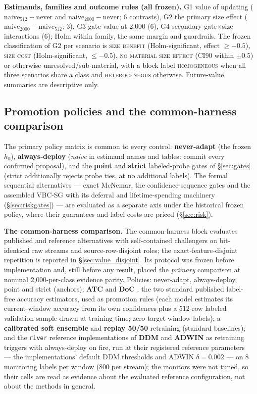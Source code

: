\documentclass[a4paper,fleqn]{cas-sc}
\begin{document}
\textbf{Estimands, families and outcome rules (all frozen).} G1 value of updating ($\mathrm{naive}_{512}-\mathrm{never}$ and $\mathrm{naive}_{2000}-\mathrm{never}$; 6 contrasts), G2 the primary size effect ($\mathrm{naive}_{2000}-\mathrm{naive}_{512}$; 3), G3 gate value at 2{,}000 (6), G4 secondary gate$\times$size interactions (6); Holm within family, the same margin and guardrails. The frozen classification of G2 per scenario is \textsc{size benefit} (Holm-significant, effect $\ge +0.5$), \textsc{size cost} (Holm-significant, $\le -0.5$), \textsc{no material size effect} (CI90 within $\pm0.5$) or otherwise unresolved/sub-material, with a block label \textsc{homogeneous} when all three scenarios share a class and \textsc{heterogeneous} otherwise. Future-value summaries are descriptive only.

\subsection{Promotion policies and the common-harness comparison}
\label{sec:baselines_method}

The primary policy matrix is common to every control: \textbf{never-adapt} (the frozen $h_0$), \textbf{always-deploy} (\emph{naive} in estimand names and tables: commit every confirmed proposal), and the \textbf{point} and \textbf{strict} labeled-probe gates of \S\ref{sec:gates} (strict additionally rejects probe ties, at no additional labels). The formal sequential alternatives --- exact McNemar, the confidence-sequence gates and the assembled VBC-SG with its deferral and lifetime-spending machinery (\S\ref{sec:riskgates}) --- are evaluated as a separate axis under the historical frozen policy, where their guarantees and label costs are priced (\S\ref{sec:risk}).

\textbf{The common-harness comparison.} The common-harness block evaluates published and reference alternatives with self-contained challengers on bit-identical raw streams and source-row-disjoint roles; the exact-feature-disjoint repetition is reported in \S\ref{sec:value_disjoint}. Its protocol was frozen before implementation and, still before any result, placed the \emph{primary} comparison at nominal 2{,}000-per-class evidence parity. Policies: never-adapt, always-deploy, point and strict (anchors); \textbf{ATC} \cite{garg2022atc} and \textbf{DoC} \cite{guillory2021doc}, the two standard published label-free accuracy estimators, used as promotion rules (each model estimates its current-window accuracy from its own confidences plus a 512-row labeled validation sample drawn at training time; zero target-window labels); a \textbf{calibrated soft ensemble} and \textbf{replay 50/50} retraining (standard baselines); and the \texttt{river} reference implementations of \textbf{DDM} and \textbf{ADWIN} \cite{gama2004learning,bifet2007learning} as retraining triggers with always-deploy on fire, run at their registered reference parameters --- the implementations' default DDM thresholds and ADWIN $\delta=0.002$ --- on 8 monitoring labels per window (800 per stream); the monitors were not tuned, so their cells are read as evidence about the evaluated reference configuration, not about the methods in general.
\end{document}
